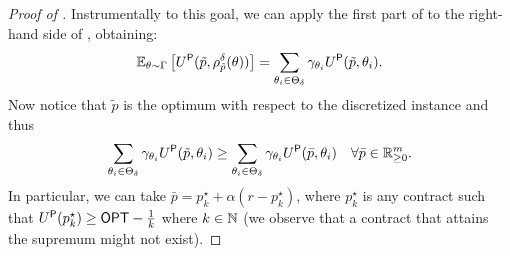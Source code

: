 \begin{proof}[Proof of ]
    Instrumentally to this goal, we can apply the first part of  to the right-hand side of , obtaining:
	\begin{align}\label{eq:ptasAdded}
	\mathbb{E}_{\theta\sim\Gamma} \left[U^\textsf{P}(\tilde p, \rho^\delta_{\tilde p}(\theta))\right]= \sum_{\theta_i\in\Theta_{\delta}} \gamma_{\theta_i} U^\textsf{P}(\tilde p, \theta_i).
	\end{align}
	Now notice that $\tilde p$ is the optimum with respect to the discretized instance and thus  
    \begin{align}\label{eq:ptasAdded2}
    \sum_{\theta_i\in\Theta_{\delta}} \gamma_{\theta_i} U^\textsf{P}(\tilde p, \theta_i)\ge \sum_{\theta_i\in\Theta_{\delta}} \gamma_{\theta_i} U^\textsf{P}(\bar p, \theta_i)\quad \forall \bar p\in \mathbb{R}^m_{\ge 0}.
    \end{align}
	In particular, we can take $\bar p=p^{\star}_k+\alpha(r-p^{\star}_k)$, where $p^{\star}_k$ is any contract such that $U^\textsf{P}(p^{\star}_k)\ge \textsf{OPT}-\frac{1}{k}$ where $k\in\mathbb{N}$ (we observe that a contract that attains the supremum might not exist).


\end{proof}
